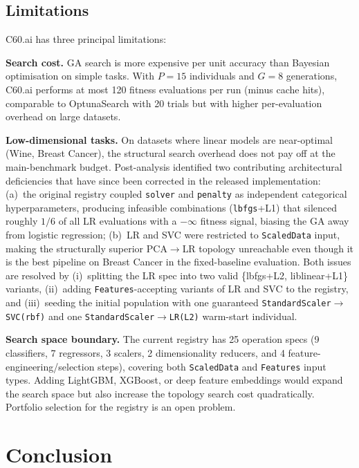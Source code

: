 \documentclass{article}
\theoremstyle{definition}
\theoremstyle{plain}
\theoremstyle{remark}
\begin{document}
\subsection{Limitations}

C60.ai has three principal limitations:

\textbf{Search cost.}
GA search is more expensive per unit accuracy than Bayesian optimisation on
simple tasks.
With $P{=}15$ individuals and $G{=}8$ generations, C60.ai performs at most
120 fitness evaluations per run (minus cache hits), comparable to
OptunaSearch with 20 trials but with higher per-evaluation overhead on large
datasets.

\textbf{Low-dimensional tasks.}
On datasets where linear models are near-optimal (Wine, Breast Cancer), the
structural search overhead does not pay off at the main-benchmark budget.
Post-analysis identified two contributing architectural deficiencies that have
since been corrected in the released implementation:
(a)~the original registry coupled \texttt{solver} and \texttt{penalty} as
independent categorical hyperparameters, producing infeasible combinations
(\texttt{lbfgs}+L1) that silenced roughly $1/6$ of all LR evaluations
with a $-\infty$ fitness signal, biasing the GA away from logistic regression;
(b)~LR and SVC were restricted to \texttt{ScaledData} input, making the
structurally superior \textsc{PCA}$\to$LR topology unreachable even though it
is the best pipeline on Breast Cancer in the fixed-baseline evaluation.
Both issues are resolved by (i)~splitting the LR spec into two valid
\{lbfgs+L2, liblinear+L1\} variants, (ii)~adding \texttt{Features}-accepting
variants of LR and SVC to the registry, and (iii)~seeding the initial
population with one guaranteed \texttt{StandardScaler}$\to$\texttt{SVC(rbf)}
and one \texttt{StandardScaler}$\to$\texttt{LR(L2)} warm-start individual.

\textbf{Search space boundary.}
The current registry has 25 operation specs (9 classifiers, 7 regressors,
3 scalers, 2 dimensionality reducers, and 4 feature-engineering/selection
steps), covering both \texttt{ScaledData} and \texttt{Features} input types.
Adding LightGBM, XGBoost, or deep feature embeddings would expand the search
space but also increase the topology search cost quadratically.
Portfolio selection for the registry is an open problem.

\section{Conclusion}
\end{document}
